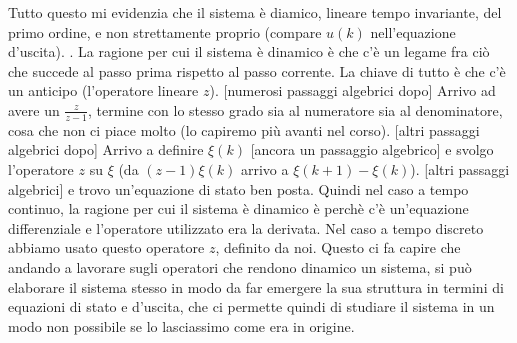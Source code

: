 Tutto questo mi evidenzia che il sistema è diamico, lineare tempo invariante, del primo ordine, e non strettamente proprio (compare $u(k)$ nell'equazione d'uscita).\newline
{}.\newline
La ragione per cui il sistema è dinamico è che c'è un legame fra ciò che succede al passo prima rispetto al passo corrente. La chiave di tutto è che c'è un anticipo (l'operatore lineare $z$). [numerosi passaggi algebrici dopo] Arrivo ad avere un $\frac{z}{z-1}$, termine con lo stesso grado sia al numeratore sia al denominatore, cosa che non ci piace molto (lo capiremo più avanti nel corso). [altri passaggi algebrici dopo] Arrivo a definire $\xi(k)$ [ancora un passaggio algebrico] e svolgo l'operatore $z$ su $\xi$ (da $(z-1)\xi(k)$ arrivo a $\xi(k+1) - \xi(k)$). [altri passaggi algebrici] e trovo un'equazione di stato ben posta.\newline
Quindi nel caso a tempo continuo, la ragione per cui il sistema è dinamico è perchè c'è un'equazione differenziale e l'operatore utilizzato era la derivata. Nel caso a tempo discreto abbiamo usato questo operatore $z$, definito da noi.\newline
Questo ci fa capire che andando a lavorare sugli operatori che rendono dinamico un sistema, si può elaborare il sistema stesso in modo da far emergere la sua struttura in termini di equazioni di stato e d'uscita, che ci permette quindi di studiare il sistema in un modo non possibile se lo lasciassimo come era in origine.\newline
\newline